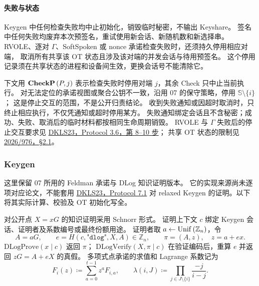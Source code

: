 \paragraph{失败与状态} Keygen 中任何检查失败均中止初始化，销毁临时秘密，不输出 Keyshare。
签名中任何失败均废弃本次预签名，重试使用新会话、新随机数和新选择串。
RVOLE、逐对 $\Gamma$、SoftSpoken 或 nonce 承诺检查失败时，还须持久停用相应对端，
取消所有共享该 OT 状态且涉及该对端的并发会话与待用预签名。
这个停用记录须在共享状态的进程和设备间生效，更换会话号不能清除它。

下文用 $\mathbf{CheckP}\left(P,j\right)$ 表示检查失败时停用对端 $j$，其余 Check 只中止当前执行。
对无法定位的承诺视图或聚合公钥不一致，沿用 07 的保守策略，停用 $\mathbb S\setminus\{i\}$；
这是停止交互的范围，不是公开归责结论。
收到失败通知或因超时取消时，只终止相应执行，不仅凭通知或超时停用某方。
失败通知绑定会话且不含秘密；成功、失败、取消后的临时材料都按相同生命周期销毁。
RVOLE 与 $\Gamma$ 失败后的停止交互要求见
\href{https://eprint.iacr.org/2023/765.pdf}{DKLS23，Protocol 3.6，第 8--10 步}；
共享 OT 状态的限制见 \href{https://eprint.iacr.org/2026/976.pdf}{2026/976，\S2.1}。

\subsubsection{Keygen}

这里保留 07 所用的 Feldman 承诺与 DLog 知识证明版本。
它的实现来源尚未逐项对应论文，不能套用
\href{https://eprint.iacr.org/2023/765.pdf}{DKLS23，Protocol 7.1}
对 relaxed Keygen 的证明。以下将其实际计算、校验及 OT 初始化写全。

对公开点 $X=xG$ 的知识证明采用 Schnorr 形式。
证明上下文 $c$ 绑定 Keygen 会话、证明者及系数编号或最终份额用途。
证明者取 $a\gets\mathrm{Unif}\left(\mathbb Z_n\right)$，令
\[
  A=aG,\qquad e=H(c,\texttt{"dlog"},X,A)\in\mathbb Z_n,
  \qquad \pi=(A,z),\quad z=a+ex.
\]
$\mathrm{DLogProve}(x\mid c)$ 返回 $\pi$；
$\mathrm{DLogVerify}(X,\pi\mid c)$ 在验证编码后，重算 $e$ 并返回 $zG=A+eX$ 的真假。
多项式点承诺的求值和 Lagrange 系数记为
\[
  F_i(z)\coloneq\sum_{a=0}^{t-1}z^aF_{i,a},\qquad
  \lambda(i,J)\coloneq\prod_{j\in J\setminus\{i\}}\frac{-j}{i-j}.
\]

